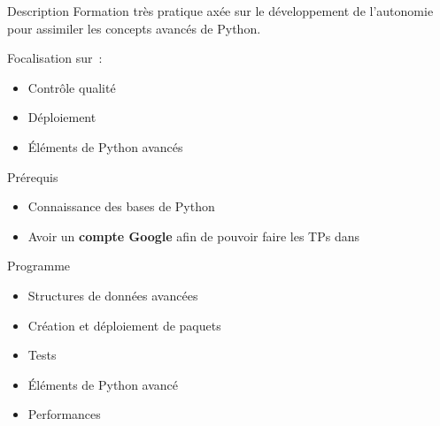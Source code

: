\begin{frame}{Description}
  Formation très pratique axée sur le développement de l'autonomie pour assimiler les concepts avancés de Python.

  Focalisation sur~:

  \begin{itemize}
    \item Contrôle qualité
    \item Déploiement
    \item Éléments de Python avancés
  \end{itemize}
\end{frame}

\begin{frame}{Prérequis}
  \begin{itemize}
  \item Connaissance des bases de Python
  \item Avoir un \textbf{compte Google} afin de pouvoir faire les TPs dans 
  \end{itemize}
\end{frame}

\begin{frame}{Programme}
  \begin{itemize}
  \item Structures de données avancées
  \item Création et déploiement de paquets
  \item Tests
  \item Éléments de Python avancé
  \item Performances
  \end{itemize}
\end{frame}
